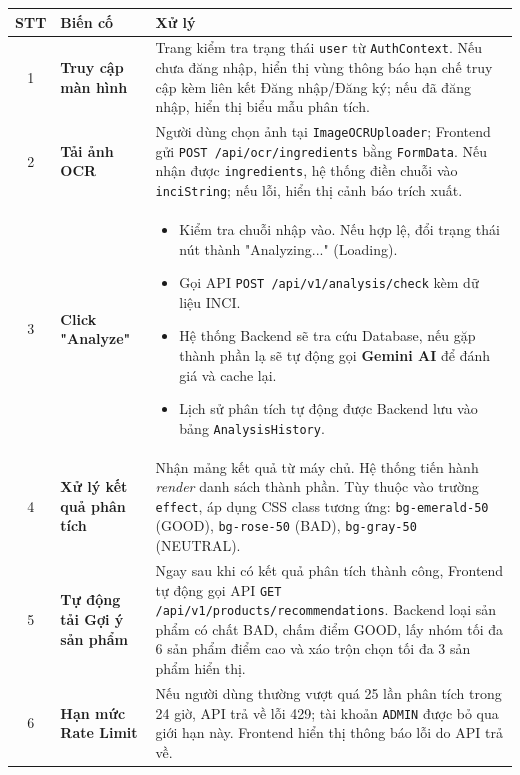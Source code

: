 \documentclass[12pt,a4paper]{article}
\begin{document}
\begin{center}
\renewcommand{\arraystretch}{1.5}
\begin{tabularx}{\textwidth}{|c|l|X|}
\hline
\rowcolor{blue!20}
\textbf{STT} & \textbf{Biến cố} & \textbf{Xử lý} \\ \hline

1 & \textbf{Truy cập màn hình} & Trang kiểm tra trạng thái \texttt{user} từ \texttt{AuthContext}. Nếu chưa đăng nhập, hiển thị vùng thông báo hạn chế truy cập kèm liên kết Đăng nhập/Đăng ký; nếu đã đăng nhập, hiển thị biểu mẫu phân tích. \\ \hline

2 & \textbf{Tải ảnh OCR} & Người dùng chọn ảnh tại \texttt{ImageOCRUploader}; Frontend gửi \texttt{POST /api/ocr/ingredients} bằng \texttt{FormData}. Nếu nhận được \texttt{ingredients}, hệ thống điền chuỗi vào \texttt{inciString}; nếu lỗi, hiển thị cảnh báo trích xuất. \\ \hline

3 & \textbf{Click "Analyze"} & 
\begin{itemize}
    \item Kiểm tra chuỗi nhập vào. Nếu hợp lệ, đổi trạng thái nút thành "Analyzing..." (Loading).
    \item Gọi API \texttt{POST /api/v1/analysis/check} kèm dữ liệu INCI.
    \item Hệ thống Backend sẽ tra cứu Database, nếu gặp thành phần lạ sẽ tự động gọi \textbf{Gemini AI} để đánh giá và cache lại.
    \item Lịch sử phân tích tự động được Backend lưu vào bảng \texttt{AnalysisHistory}.
\end{itemize} \\ \hline

4 & \textbf{Xử lý kết quả phân tích} & Nhận mảng kết quả từ máy chủ. Hệ thống tiến hành \textit{render} danh sách thành phần. Tùy thuộc vào trường \texttt{effect}, áp dụng CSS class tương ứng: \texttt{bg-emerald-50} (GOOD), \texttt{bg-rose-50} (BAD), \texttt{bg-gray-50} (NEUTRAL). \\ \hline

5 & \textbf{Tự động tải Gợi ý sản phẩm} & Ngay sau khi có kết quả phân tích thành công, Frontend tự động gọi API \texttt{GET /api/v1/products/recommendations}. Backend loại sản phẩm có chất BAD, chấm điểm GOOD, lấy nhóm tối đa 6 sản phẩm điểm cao và xáo trộn chọn tối đa 3 sản phẩm hiển thị. \\ \hline

6 & \textbf{Hạn mức Rate Limit} & Nếu người dùng thường vượt quá 25 lần phân tích trong 24 giờ, API trả về lỗi 429; tài khoản \texttt{ADMIN} được bỏ qua giới hạn này. Frontend hiển thị thông báo lỗi do API trả về. \\ \hline

\end{tabularx}
\end{center}
\end{document}
